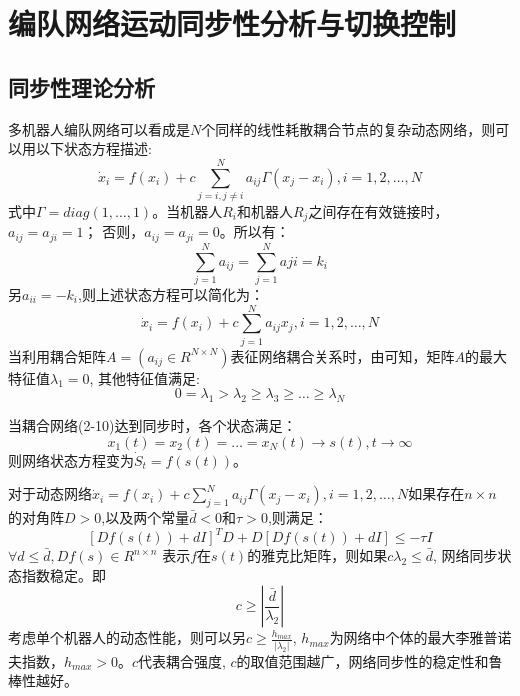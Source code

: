 \section{编队网络运动同步性分析与切换控制}

\subsection{同步性理论分析}
多机器人编队网络可以看成是$N$个同样的线性耗散耦合节点的复杂动态网络，则可以用以下状态方程描述\supercite{li2003synchronization}:
\begin{equation}
	\dot{x}_i = f(x_i) + c\sum_{j=i,j \neq i}^N a_{ij}\Gamma (x_j - x_i), i=1,2,\dots,N
\end{equation}
式中$\Gamma = diag(1,\dots,1)$。当机器人$R_i$和机器人$R_j$之间存在有效链接时，$a_{ij} = a_{ji} = 1$； 否则，$a_{ij} = a_{ji} = 0$。所以有：
\[
\sum_{j=1}^N a_{ij} = \sum_{j=1}^N a{ji} = k_i
\]
另$a_{ii} = -k_i$,则上述状态方程可以简化为：
\begin{equation}
	\dot{x}_i = f(x_i) + c\sum_{j=1}^N a_{ij}x_j, i=1,2,\dots,N 
\end{equation}
当利用耦合矩阵$A = (a_{ij} \in R^{N \times N})$表征网络耦合关系时，由\parencite{li2003synchronization}可知，矩阵$A$的最大特征值$\lambda_1 = 0$, 其他特征值满足:
\[
	0 = \lambda_1 > \lambda_2 \geq \lambda_3 \geq \dots \geq \lambda_N
\]

当耦合网络(2-10)达到同步时，各个状态满足：
\begin{equation}
	x_1(t) = x_2(t) = \dots = x_N(t) \rightarrow s(t), t \rightarrow \infty
\end{equation}
则网络状态方程变为$\dot{S}_t = f(s(t))$。

对于动态网络$\dot{x}_i = f(x_i) + c\sum_{j=1}^N a_{ij}\Gamma (x_j-x_i), i=1,2,\dots,N$如果存在$n \times n$ 的对角阵$D>0$,以及两个常量$\bar{d}<0$和$\tau>0$,则满足：
\begin{equation}
	{\left[ Df(s(t))+dI\right]}^TD + D\left[Df(s(t)) + dI\right] \leq -\tau I
\end{equation}
$\forall d \leq \bar{d}, Df(s) \in R^{n \times n}$ 表示$f$在$s(t)$的雅克比矩阵，则如果$c\lambda_2 \leq \bar{d}$, 网络同步状态指数稳定。即
\begin{equation}
	c \geq |\frac{\bar{d}}{\lambda_2}|
\end{equation}
考虑单个机器人的动态性能，则可以另$c \geq \frac{h_{max}}{|\lambda_2|}$, $h_{max}$为网络中个体的最大李雅普诺夫指数，$h_{max}>0$。$c$代表耦合强度, $c$的取值范围越广，网络同步性的稳定性和鲁棒性越好。

